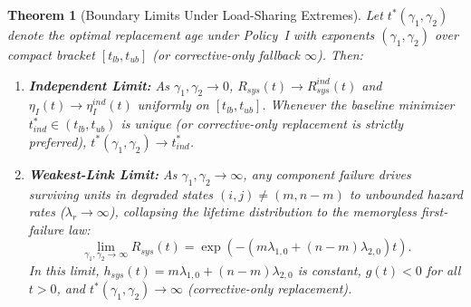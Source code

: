\documentclass[10pt,a4paper]{article}
\newtheorem{theorem}{Theorem}
\begin{document}
\begin{theorem}[Boundary Limits Under Load-Sharing Extremes]
Let $t^*(\gamma_1, \gamma_2)$ denote the optimal replacement age under Policy~I with exponents $(\gamma_1, \gamma_2)$ over compact bracket $[t_{lb}, t_{ub}]$ (or corrective-only fallback $\infty$). Then:
\begin{enumerate}
    \item \textbf{Independent Limit:} As $\gamma_1, \gamma_2 \to 0$, $R_{sys}(t) \to R_{sys}^{ind}(t)$ and $\eta_I(t) \to \eta_I^{ind}(t)$ uniformly on $[t_{lb}, t_{ub}]$. Whenever the baseline minimizer $t_{ind}^* \in (t_{lb}, t_{ub})$ is unique (or corrective-only replacement is strictly preferred), $t^*(\gamma_1, \gamma_2) \to t_{ind}^*$.
    \item \textbf{Weakest-Link Limit:} As $\gamma_1, \gamma_2 \to \infty$, any component failure drives surviving units in degraded states $(i, j) \neq (m, n-m)$ to unbounded hazard rates ($\lambda_r \to \infty$), collapsing the lifetime distribution to the memoryless first-failure law:
    $$\lim_{\gamma_1, \gamma_2 \to \infty} R_{sys}(t) = \exp\left( -(m \lambda_{1,0} + (n - m) \lambda_{2,0}) t \right).$$
    In this limit, $h_{sys}(t) = m \lambda_{1,0} + (n - m) \lambda_{2,0}$ is constant, $g(t) < 0$ for all $t > 0$, and $t^*(\gamma_1, \gamma_2) \to \infty$ (corrective-only replacement).
\end{enumerate}
\end{theorem}
\end{document}
